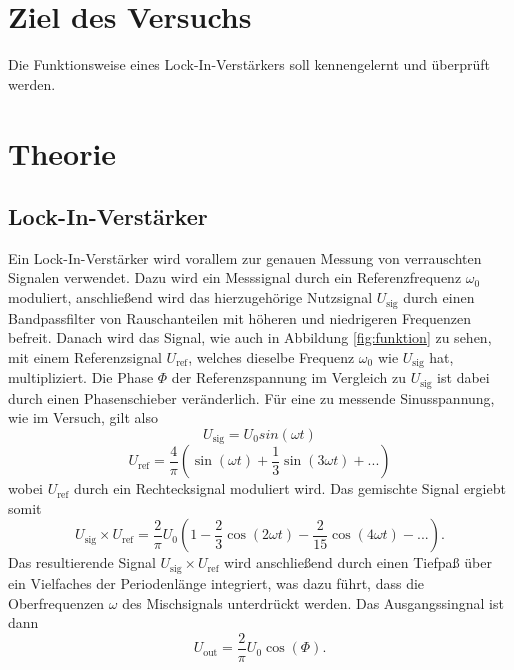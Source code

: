 \section{Ziel des Versuchs}
\label{sec:Ziel des Versuchs}
Die Funktionsweise eines Lock-In-Verstärkers soll kennengelernt und überprüft werden.
\section{Theorie}
\label{sec:Theorie}
\subsection{Lock-In-Verstärker}
    Ein Lock-In-Verstärker wird vorallem zur genauen Messung von verrauschten Signalen verwendet.
    Dazu wird ein Messsignal durch ein Referenzfrequenz $\omega_0$ moduliert, anschließend wird das
    hierzugehörige Nutzsignal $U_\text{sig}$ durch einen Bandpassfilter von Rauschanteilen mit höheren und niedrigeren Frequenzen
    befreit. Danach wird das Signal, wie auch in Abbildung \ref{fig:funktion} zu sehen, mit einem Referenzsignal
    $U_\text{ref}$, welches dieselbe Frequenz $\omega_0$ wie $U_\text{sig}$ hat, multipliziert. Die Phase $\Phi$ der Referenzspannung im Vergleich zu $U_\text{sig}$
    ist dabei durch einen Phasenschieber veränderlich. 
    Für eine zu messende Sinusspannung, wie im Versuch, gilt also
    \begin{equation}
        U_\text{sig} = U_0 sin(\omega t)
    \end{equation} 
    \begin{equation}
        U_\text{ref} = \frac {4}{\pi} (\sin (\omega t) + \frac {1}{3} \sin(3 \omega t) + ... )
    \end{equation}
    wobei $U_\text{ref}$ durch ein Rechtecksignal moduliert wird. Das gemischte Signal ergiebt somit
    \begin{equation}
        U_\text{sig} \times U_\text{ref} = \frac {2}{\pi} U_0 (1- \frac{2}{3} \cos (2 \omega t) - \frac {2}{15} \cos (4 \omega t) - ...).
    \end{equation}
    Das resultierende Signal $U_\text{sig} \times U_\text{ref}$ wird anschließend durch einen Tiefpaß über ein Vielfaches der Periodenlänge
    integriert, was dazu führt, dass die Oberfrequenzen $\omega$ des Mischsignals unterdrückt werden. Das Ausgangssingnal ist dann
    \begin{equation}
    \label{eqn:u_out}
        U_\text{out} = \frac{2}{\pi} U_0 \cos (\Phi) .
    \end{equation}
